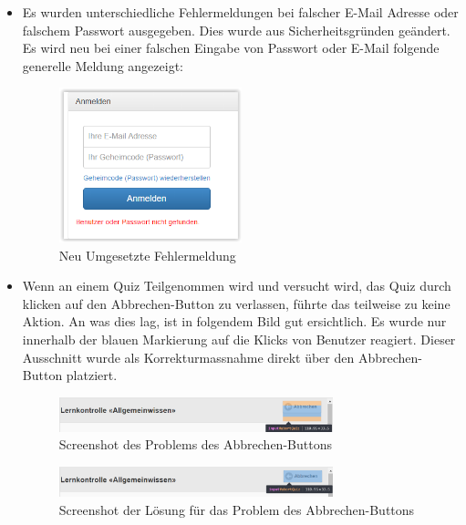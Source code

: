 \begin{itemize}
	\item Es wurden unterschiedliche Fehlermeldungen bei falscher E-Mail Adresse oder falschem Passwort ausgegeben. Dies wurde aus Sicherheitsgründen geändert. Es wird neu bei einer falschen Eingabe von Passwort oder E-Mail folgende generelle Meldung angezeigt:	
	\begin{figure}[H]
		\centering
		\includegraphics[width=0.5\textwidth]
		{Images/nachher_Email-und-Passwort.PNG}
		\caption{Neu Umgesetzte Fehlermeldung}
	\end{figure}

	\item Wenn an einem Quiz Teilgenommen wird und versucht wird, das Quiz durch klicken auf den Abbrechen-Button zu verlassen, führte das teilweise zu keine Aktion. An was dies lag, ist in folgendem Bild gut ersichtlich. Es wurde nur innerhalb der blauen Markierung auf die Klicks von Benutzer reagiert. Dieser Ausschnitt wurde als Korrekturmassnahme direkt über den Abbrechen-Button platziert.
	\begin{figure}[H]
		\centering
		\includegraphics[width=0.75\textwidth]
		{Images/CancelButtonProblem.PNG}
		\caption{Screenshot des Problems des Abbrechen-Buttons}
	\end{figure}
	
	\begin{figure}[H]
		\centering
		\includegraphics[width=0.75\textwidth]
		{Images/CancelButtonFix.PNG}
		\caption{Screenshot der Lösung für das Problem des Abbrechen-Buttons}
	\end{figure}
	

\end{itemize}
